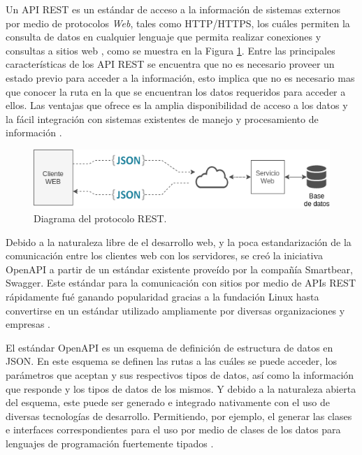 Un API REST es un estándar de acceso a la información de sistemas externos por medio de protocolos \textit{Web}, tales como HTTP/HTTPS, los cuáles permiten la consulta de datos en cualquier lenguaje que permita realizar conexiones y consultas a sitios web \cite{REST_API_design}, como se muestra en la Figura \ref{fig:rest_protocolo_imagen}. Entre las principales características de los API REST se encuentra que no es necesario proveer un estado previo para acceder a la información, esto implica que no es necesario mas que conocer la ruta en la que se encuentran los datos requeridos para acceder a ellos. Las ventajas que ofrece es la amplia disponibilidad de acceso a los datos y la fácil integración con sistemas existentes de manejo y procesamiento de información \cite{OpenAPI_example}.


\begin{figure}[!ht]
	\centering
	\includegraphics[width=.70\linewidth]{images/diagrams/rest.drawio.png}
	\caption{Diagrama del protocolo REST.}
	\label{fig:rest_protocolo_imagen}
\end{figure}


Debido a la naturaleza libre de el desarrollo web, y la poca estandarización de la comunicación entre los clientes web con los servidores, se creó la iniciativa OpenAPI a partir de un estándar existente proveído por la compañía Smartbear, Swagger. Este estándar para la comunicación con sitios por medio de APIs REST rápidamente fué ganando popularidad gracias a la fundación Linux hasta convertirse en un estándar utilizado ampliamente por diversas organizaciones y empresas \cite{OpenAPI_foundation}.

El estándar OpenAPI es un esquema de definición de estructura de datos en JSON. En este esquema se definen las rutas a las cuáles se puede acceder, los parámetros que aceptan y sus respectivos tipos de datos, así como la información que responde y los tipos de datos de los mismos. Y debido a la naturaleza abierta del esquema, este puede ser generado e integrado nativamente con el uso de diversas tecnologías de desarrollo. Permitiendo, por ejemplo, el generar las clases e interfaces correspondientes para el uso por medio de clases de los datos para lenguajes de programación fuertemente tipados \cite{openapi_generator}.

